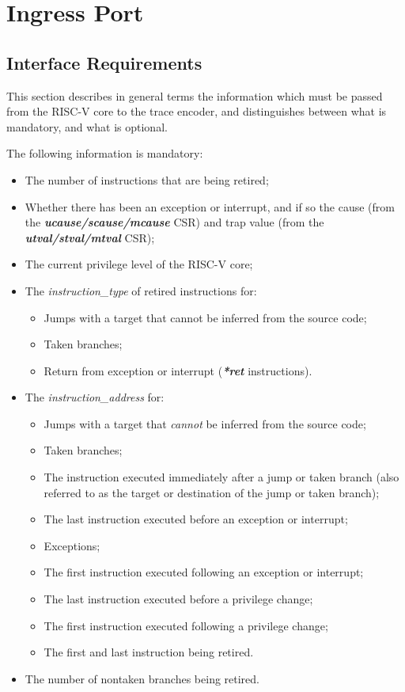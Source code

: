 \chapter{Ingress Port} \label{Interface}

\section{Interface Requirements}
This section describes in general terms the information which must be passed from the RISC-V core to the trace encoder,
and distinguishes between what is mandatory, and what is optional.

The following information is mandatory:

\begin{itemize}
  \item The number of instructions that are being retired;
  \item Whether there has been an exception or interrupt, and if so the cause (from the \textbf{\textit{ucause/scause/mcause}} CSR)
        and trap value (from the \textbf{\textit{utval/stval/mtval}} CSR);
  \item The current privilege level of the RISC-V core;
  \item The \textit{instruction\_type} of retired instructions for:
    \begin{itemize}
      \item Jumps with a target that cannot be inferred from the source code;
      \item Taken branches;
      \item Return from exception or interrupt (\textbf{\textit{*ret}} instructions).
    \end{itemize}
  \item The \textit{instruction\_address} for:
    \begin{itemize}
      \item Jumps with a target that \textit{cannot} be inferred from the source code;
      \item Taken branches;
      \item The instruction executed immediately after a jump or taken branch (also referred to as the target or destination of the jump or taken branch);
      \item The last instruction executed before an exception or interrupt;
      \item Exceptions;
      \item The first instruction executed following an exception or interrupt;
      \item The last instruction executed before a privilege change;
      \item The first instruction executed following a privilege change;
      \item The first and last instruction being retired.
    \end{itemize}
  \item The number of nontaken branches being retired.
\end{itemize}

